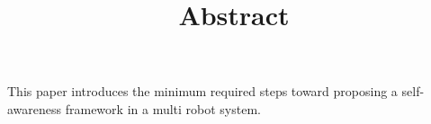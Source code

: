 \documentclass[a4paper]{article}
\title{Abstract}
\date{}
\begin{document}
    \maketitle
    This paper introduces the minimum required steps toward proposing a self-awareness framework in a multi robot system.
\end{document}
